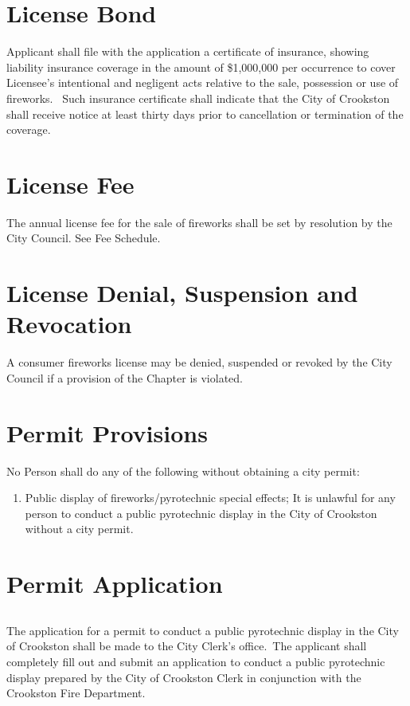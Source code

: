 \section{License Bond}
Applicant shall file with the application a certificate of insurance, showing liability insurance coverage in the amount of \$1,000,000 per occurrence to cover Licensee's intentional and negligent acts relative to the sale, possession or use of fireworks.  Such insurance certificate shall indicate that the City of Crookston shall receive notice at least thirty days prior to cancellation or termination of the coverage.

\section{License Fee}
The annual license fee for the sale of fireworks shall be set by resolution by the City Council. See Fee Schedule.

\section{License Denial, Suspension and Revocation}
A consumer fireworks license may be denied, suspended or revoked by the City Council if a provision of the Chapter is violated.

\section{Permit Provisions}
No Person shall do any of the following without obtaining a city permit:
\begin{enumerate}[{\indent}A)]
    \item Public display of fireworks/pyrotechnic special effects; It is unlawful for any person to conduct a public pyrotechnic display in the City of Crookston without a city permit.
\end{enumerate}

\section{Permit Application}
\subsection{}
The application for a permit to conduct a public pyrotechnic display in the City of Crookston shall be made to the City Clerk's office. The applicant shall completely fill out and submit an application to conduct a public pyrotechnic display prepared by the City of Crookston Clerk in conjunction with the Crookston Fire Department.
